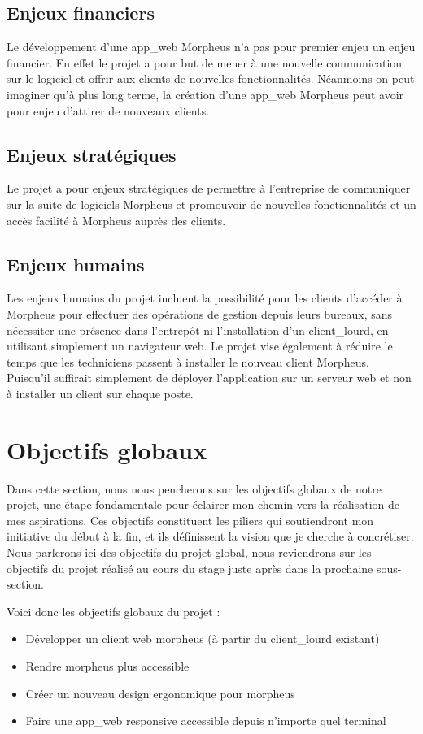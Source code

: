 \documentclass[a4paper, 12pt, french]{article}
\newcommand{\bdot}{\item[\color{ssiYellow}\ding{108}]}
\begin{document}
					\subsection{Enjeux financiers}
						Le développement d'une \gls{app_web} Morpheus n'a pas pour premier enjeu un enjeu financier. En effet le projet a pour but de mener à une nouvelle communication sur le logiciel et offrir aux clients de nouvelles fonctionnalités. Néanmoins on peut imaginer qu'à plus long terme, la création d'une \gls{app_web} Morpheus peut avoir pour enjeu d'attirer de nouveaux clients.
	
					\subsection{Enjeux stratégiques}
						Le projet a pour enjeux stratégiques de permettre à l'entreprise de communiquer sur la suite de logiciels Morpheus et promouvoir de nouvelles fonctionnalités et un accès facilité à Morpheus auprès des clients.

					\subsection{Enjeux humains}
						Les enjeux humains du projet incluent la possibilité pour les clients d'accéder à Morpheus pour effectuer des opérations de gestion depuis leurs bureaux, sans nécessiter une présence dans l'entrepôt ni l'installation d'un \gls{client_lourd}, en utilisant simplement un navigateur web. Le projet vise également à réduire le temps que les techniciens passent à installer le nouveau client Morpheus. Puisqu'il suffirait simplement de déployer l'application sur un serveur web et non à installer un client sur chaque poste.
				
				\section{Objectifs globaux}
					Dans cette section, nous nous pencherons sur les objectifs globaux de notre projet, une étape fondamentale pour éclairer mon chemin vers la réalisation de mes aspirations. Ces objectifs constituent les piliers qui soutiendront mon initiative du début à la fin, et ils définissent la vision que je cherche à concrétiser. Nous parlerons ici des objectifs du projet global, nous reviendrons sur les objectifs du projet réalisé au cours du stage juste après dans la prochaine sous-section.
					
					Voici donc les objectifs globaux du projet :
					\begin{itemize}
						\bdot{Développer un client web morpheus (à partir du \gls{client_lourd} existant)}
						\bdot{Rendre morpheus plus accessible}
						\bdot{Créer un nouveau design ergonomique pour morpheus}
						\bdot{Faire une \gls{app_web} responsive accessible depuis n'importe quel terminal}%
					\end{itemize}
				
\end{document}
